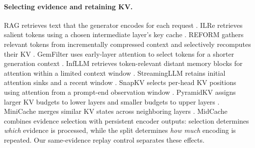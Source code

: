 \paragraph{Selecting evidence and retaining KV.}
RAG retrieves text that the generator encodes for each request \citep{rag}. ILRe retrieves salient tokens using a chosen intermediate layer's key cache \citep{ilre}. REFORM gathers relevant tokens from incrementally compressed context and selectively recomputes their KV \citep{reform}. GemFilter uses early-layer attention to select tokens for a shorter generation context \citep{gemfilter}. InfLLM retrieves token-relevant distant memory blocks for attention within a limited context window \citep{infllm}. StreamingLLM retains initial attention sinks and a recent window \citep{streamingllm}. SnapKV selects per-head KV positions using attention from a prompt-end observation window \citep{snapkv}. PyramidKV assigns larger KV budgets to lower layers and smaller budgets to upper layers \citep{pyramidkv}. MiniCache merges similar KV states across neighboring layers \citep{minicache}. MidCache combines evidence selection with persistent encoder outputs: selection determines \emph{which} evidence is processed, while the split determines \emph{how much} encoding is repeated. Our same-evidence replay control separates these effects.
